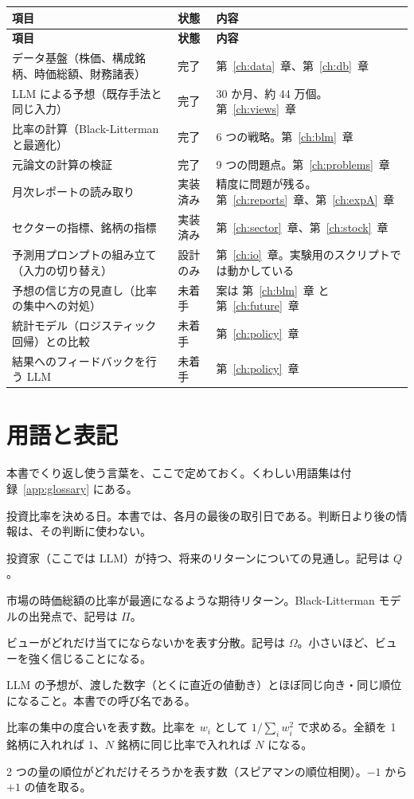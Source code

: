 \documentclass[xelatex,ja=standard,jafont=hiragino-pron,a4paper,10pt]{bxjsreport}
\newcommand{\chapref}[1]{第~\ref{#1}~章}
\begin{document}
\begin{longtable}{p{5.20cm}p{2.00cm}p{7.20cm}}
\toprule
\textbf{項目} & \textbf{状態} & \textbf{内容} \\
\midrule
\endfirsthead
\toprule
\textbf{項目} & \textbf{状態} & \textbf{内容} \\
\midrule
\endhead
\bottomrule
\endfoot
データ基盤（株価、構成銘柄、時価総額、財務諸表） & 完了 & \chapref{ch:data}、\chapref{ch:db} \\
LLM による予想（既存手法と同じ入力） & 完了 & 30 か月、約 44 万個。\chapref{ch:views} \\
比率の計算（Black-Litterman と最適化） & 完了 & 6 つの戦略。\chapref{ch:blm} \\
元論文の計算の検証 & 完了 & 9 つの問題点。\chapref{ch:problems} \\
月次レポートの読み取り & 実装済み & 精度に問題が残る。\chapref{ch:reports}、\chapref{ch:expA} \\
セクターの指標、銘柄の指標 & 実装済み & \chapref{ch:sector}、\chapref{ch:stock} \\
予測用プロンプトの組み立て（入力の切り替え） & 設計のみ & \chapref{ch:io}。実験用のスクリプトでは動かしている \\
予想の信じ方の見直し（比率の集中への対処） & 未着手 & 案は \chapref{ch:blm} と \chapref{ch:future} \\
統計モデル（ロジスティック回帰）との比較 & 未着手 & \chapref{ch:policy} \\
結果へのフィードバックを行う LLM & 未着手 & \chapref{ch:policy} \\
\end{longtable}

\section{用語と表記}

本書でくり返し使う言葉を、ここで定めておく。くわしい用語集は付録~\ref{app:glossary} にある。

\begin{description}[leftmargin=7.5em,style=nextline,itemsep=0.2em]
\item[判断日] 投資比率を決める日。本書では、各月の最後の取引日である。判断日より後の情報は、その判断に使わない。
\item[ビュー] 投資家（ここでは LLM）が持つ、将来のリターンについての見通し。記号は $Q$。
\item[均衡リターン] 市場の時価総額の比率が最適になるような期待リターン。Black-Litterman モデルの出発点で、記号は $\Pi$。
\item[予想の不確かさ] ビューがどれだけ当てにならないかを表す分散。記号は $\Omega$。小さいほど、ビューを強く信じることになる。
\item[なぞり] LLM の予想が、渡した数字（とくに直近の値動き）とほぼ同じ向き・同じ順位になること。本書での呼び名である。
\item[実質的な銘柄数] 比率の集中の度合いを表す数。比率を $w_i$ として $1/\sum_i w_i^2$ で求める。全額を 1 銘柄に入れれば 1、$N$ 銘柄に同じ比率で入れれば $N$ になる。
\item[順位相関] 2 つの量の順位がどれだけそろうかを表す数（スピアマンの順位相関）。$-1$ から $+1$ の値を取る。
\end{description}
\end{document}
